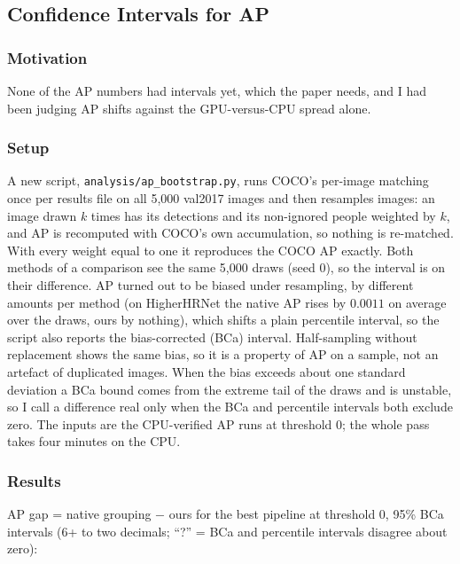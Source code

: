 \subsection{Confidence Intervals for AP}

\subsubsection{Motivation}

None of the AP numbers had intervals yet, which the paper needs, and I had been judging AP shifts against the GPU-versus-CPU spread alone.

\subsubsection{Setup}

A new script, \texttt{analysis/ap\_bootstrap.py}, runs COCO's per-image matching once per results file on all 5,000 val2017 images and then resamples images: an image drawn $k$ times has its detections and its non-ignored people weighted by $k$, and AP is recomputed with COCO's own accumulation, so nothing is re-matched.
With every weight equal to one it reproduces the COCO AP exactly.
Both methods of a comparison see the same 5,000 draws (seed 0), so the interval is on their difference.
AP turned out to be biased under resampling, by different amounts per method (on HigherHRNet the native AP rises by $0.0011$ on average over the draws, ours by nothing), which shifts a plain percentile interval, so the script also reports the bias-corrected (BCa) interval.
Half-sampling without replacement shows the same bias, so it is a property of AP on a sample, not an artefact of duplicated images.
When the bias exceeds about one standard deviation a BCa bound comes from the extreme tail of the draws and is unstable, so I call a difference real only when the BCa and percentile intervals both exclude zero.
The inputs are the CPU-verified AP runs at threshold 0; the whole pass takes four minutes on the CPU.

\subsubsection{Results}

AP gap = native grouping $-$ ours for the best pipeline at threshold 0, 95\% BCa intervals (6+ to two decimals; ``?'' = BCa and percentile intervals disagree about zero):

